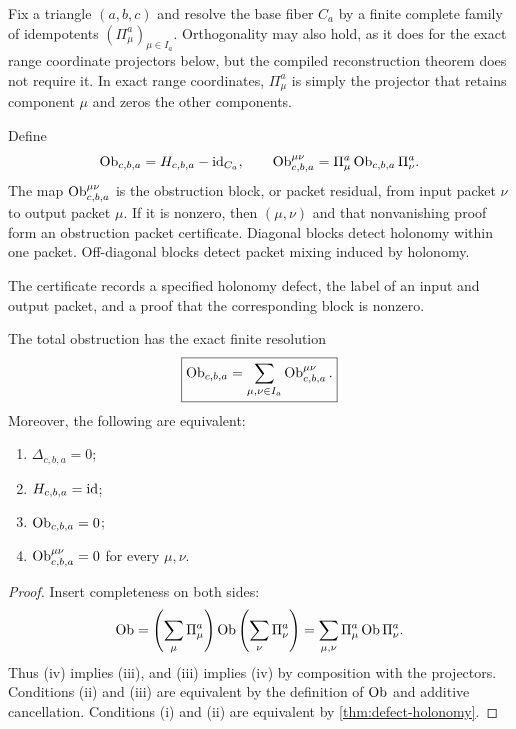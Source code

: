 Fix a triangle $(a,b,c)$ and resolve the base fiber $C_a$ by a finite complete
family of idempotents $(\Pi^a_\mu)_{\mu\in I_a}$.  Orthogonality may also hold,
as it does for the exact range coordinate projectors below, but the compiled
reconstruction theorem does not require it.  In exact range coordinates,
$\Pi^a_\mu$ is simply the projector that retains component $\mu$ and zeros
the other components.

\begin{definition}
\label{def:obstruction-packet}
Define
\[
\operatorname{Ob}_{c,b,a}=H_{c,b,a}-\operatorname{id}_{C_a},
\qquad
\operatorname{Ob}^{\mu\nu}_{c,b,a}
=
\Pi^a_\mu\operatorname{Ob}_{c,b,a}\Pi^a_\nu.
\]
The map $\operatorname{Ob}^{\mu\nu}_{c,b,a}$ is the obstruction block, or packet residual,
from input packet $\nu$ to output packet $\mu$.  If it is nonzero, then
$(\mu,\nu)$ and that nonvanishing proof form an obstruction packet
certificate.  Diagonal blocks detect holonomy within one packet.  Off-diagonal
blocks detect packet mixing induced by holonomy.
\end{definition}

The certificate records a specified holonomy defect, the label of an input
and output packet, and a proof that the corresponding block is nonzero.

\begin{theorem}
\label{thm:obstruction-detection}
The total obstruction has the exact finite resolution
\[
\boxed{
\operatorname{Ob}_{c,b,a}
=
\sum_{\mu,\nu\in I_a}
\operatorname{Ob}^{\mu\nu}_{c,b,a}.
}
\]
Moreover, the following are equivalent:
\begin{enumerate}[label=(\roman*)]
\item $\Delta_{c,b,a}=0$;
\item $H_{c,b,a}=\operatorname{id}$;
\item $\operatorname{Ob}_{c,b,a}=0$;
\item $\operatorname{Ob}^{\mu\nu}_{c,b,a}=0$ for every $\mu,\nu$.
\end{enumerate}
\end{theorem}

\begin{proof}
Insert completeness on both sides:
\[
\operatorname{Ob}
=
\left(\sum_\mu\Pi^a_\mu\right)
\operatorname{Ob}
\left(\sum_\nu\Pi^a_\nu\right)
=
\sum_{\mu,\nu}\Pi^a_\mu\operatorname{Ob}\Pi^a_\nu.
\]
Thus (iv) implies (iii), and (iii) implies (iv) by composition with the
projectors.  Conditions (ii) and (iii) are equivalent by the definition of
$\operatorname{Ob}$ and additive cancellation.
Conditions (i) and (ii) are equivalent by
\cref{thm:defect-holonomy}.
\end{proof}

